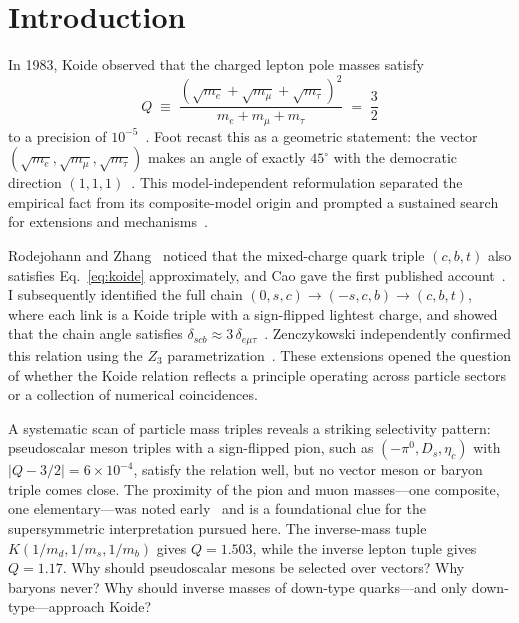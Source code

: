 \documentclass[prd,twocolumn,superscriptaddress,nofootinbib]{revtex4-2}
\begin{document}
\section{Introduction}
\label{sec:intro}

In 1983, Koide observed that the charged lepton pole masses satisfy
\begin{equation}
  Q \;\equiv\; \frac{(\sqrt{m_e}+\sqrt{m_\mu}+\sqrt{m_\tau})^2}
  {m_e + m_\mu + m_\tau}
  \;=\; \frac{3}{2}
  \label{eq:koide}
\end{equation}
to a precision of $10^{-5}$~\cite{Koide1983prd,Koide1983plb}.  Foot
recast this as a geometric statement: the vector
$(\sqrt{m_e},\sqrt{m_\mu},\sqrt{m_\tau})$ makes an angle of exactly
$45^\circ$ with the democratic direction
$(1,1,1)$~\cite{Foot1994}.  This model-independent reformulation
separated the empirical fact from its composite-model origin and prompted
a sustained search for extensions and
mechanisms~\cite{RiveroGsponer2005}.

Rodejohann and Zhang~\cite{RodejohannZhang2011} noticed that the
mixed-charge quark triple $(c,b,t)$ also satisfies Eq.~\eqref{eq:koide}
approximately, and Cao gave the first published account~\cite{Cao2012}.
I subsequently identified the full chain
$(0,s,c)\to(-s,c,b)\to(c,b,t)$, where each link is a Koide triple with
a sign-flipped lightest charge, and showed that the chain angle satisfies
$\delta_{scb}\approx 3\,\delta_{e\mu\tau}$~\cite{Rivero2013chain}.
Zenczykowski independently confirmed this relation using the $Z_3$
parametrization~\cite{Zenczykowski2012}.  These extensions opened the
question of whether the Koide relation reflects a principle operating
across particle sectors or a collection of numerical coincidences.

A systematic scan of particle mass triples reveals a striking selectivity
pattern: pseudoscalar meson triples with a sign-flipped pion, such as
$(-\pi^0,D_s,\eta_c)$ with $|Q-3/2|=6\times 10^{-4}$, satisfy the
relation well, but no vector meson or baryon triple comes close.
The proximity of the pion and muon masses---one composite, one
elementary---was noted early~\cite{ShahMir2007} and is a foundational
clue for the supersymmetric interpretation pursued here.  The
inverse-mass tuple $K(1/m_d,1/m_s,1/m_b)$ gives $Q=1.503$,
while the inverse lepton tuple gives $Q=1.17$.  Why should
pseudoscalar mesons be selected over vectors?  Why baryons never?
Why should inverse masses of down-type quarks---and only
down-type---approach Koide?
\end{document}
